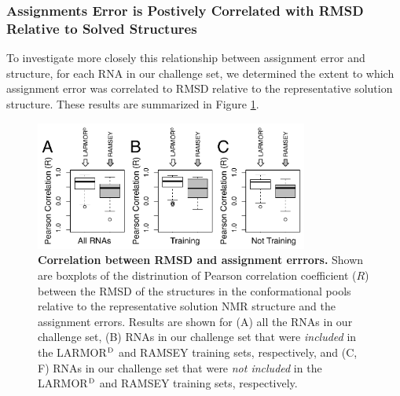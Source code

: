 \documentclass[journal=jcisd8,manuscript=article,layout=onecolumn]{achemso}
\begin{document}

\subsubsection{Assignments Error is Postively Correlated with RMSD Relative to Solved Structures} 
To investigate more closely this relationship between assignment error and structure, for each RNA in our challenge set, we determined the extent to which assignment error was correlated to RMSD relative to the representative solution structure. These results are summarized in Figure \ref{fig:correlations}. 
\begin{figure}[h!]
  \centering
       \includegraphics[width=0.8\textwidth]{figure_3}
  \caption{\textbf{Correlation between RMSD and assignment errrors.} Shown are boxplots of the distrinution of Pearson correlation coefficient ($R$) between the RMSD of the structures in the conformational pools relative to the representative solution NMR structure and the assignment errors. Results are shown for (A) all the RNAs in our challenge set, (B) RNAs in our challenge set that were \textit{included} in the LARMOR$^{\rm D}$ and RAMSEY training sets, respectively,  and (C, F) RNAs in our challenge set that were \textit{not included} in the LARMOR$^{\rm D}$ and RAMSEY training sets, respectively. }
  \label{fig:correlations}
\end{figure}
\end{document}
